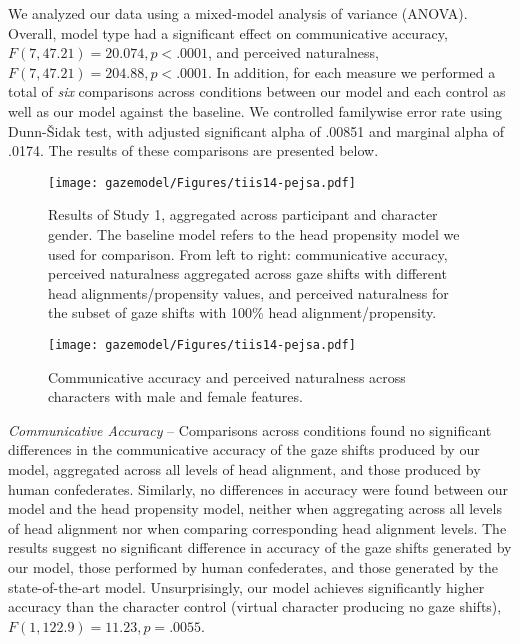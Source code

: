 We analyzed our data using a mixed-model analysis of variance (ANOVA). Overall, model type had a significant effect on communicative accuracy, $F(7, 47.21) = 20.074, p < .0001$, and perceived naturalness, $F(7, 47.21) = 204.88, p < .0001$. In addition, for each measure we performed a total of \emph{six} comparisons across conditions between our model and each control as well as our model against the baseline. We controlled familywise error rate using Dunn-\v{S}idak test, with adjusted significant alpha of .00851 and marginal alpha of .0174. The results of these comparisons are presented below.

\begin{figure}
  \centering
  \texttt{[image: gazemodel/Figures/tiis14-pejsa.pdf]}
  \caption{Results of Study 1, aggregated across participant and character gender. The baseline model refers to the head propensity model we used for comparison. From left to right: communicative accuracy, perceived naturalness aggregated across gaze shifts with different head alignments/propensity values, and perceived naturalness for the subset of gaze shifts with 100\% head alignment/propensity.}
  \label{fig:ModelEvalResults}
\end{figure}

\begin{figure}
  \centering
  \texttt{[image: gazemodel/Figures/tiis14-pejsa.pdf]}
  \caption{Communicative accuracy and perceived naturalness across characters with male and female features.}
  \label{fig:ModelEvalResultsGender}
\end{figure}

\emph{Communicative Accuracy} -- Comparisons across conditions found no significant differences in the communicative accuracy of the gaze shifts produced by our model, aggregated across all levels of head alignment, and those produced by human confederates. Similarly, no differences in accuracy were found between our model and the head propensity model, neither when aggregating across all levels of head alignment nor when comparing corresponding head alignment levels. The results suggest no significant difference in accuracy of the gaze shifts generated by our model, those performed by human confederates, and those generated by the state-of-the-art model. Unsurprisingly, our model achieves significantly higher accuracy than the character control (virtual character producing no gaze shifts), $F(1, 122.9) = 11.23, p = .0055$.

